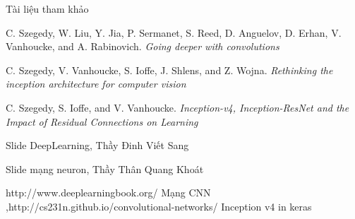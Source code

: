 \documentclass[compress]{beamer}
\begin{document}
\begin{frame}{Tài liệu tham khảo}
\begin{thebibliography}{9}
 C. Szegedy, W. Liu, Y. Jia, P. Sermanet, S. Reed, D. Anguelov, D. Erhan, V. Vanhoucke, and A. Rabinovich. \textit{Going deeper with convolutions}

 C. Szegedy, V. Vanhoucke, S. Ioffe, J. Shlens, and Z. Wojna. \textit{Rethinking the inception architecture for computer vision}

 C. Szegedy, S. Ioffe, and V. Vanhoucke. \textit{Inception-v4, Inception-ResNet and the Impact of Residual Connections on Learning}

 Slide DeepLearning, Thầy Đinh Viết Sang 

 Slide mạng neuron, Thầy Thân Quang Khoát

  http://www.deeplearningbook.org/
 Mạng CNN ,http://cs231n.github.io/convolutional-networks/
 Inception v4 in keras 
\end{thebibliography}

\end{frame}
\end{document}

